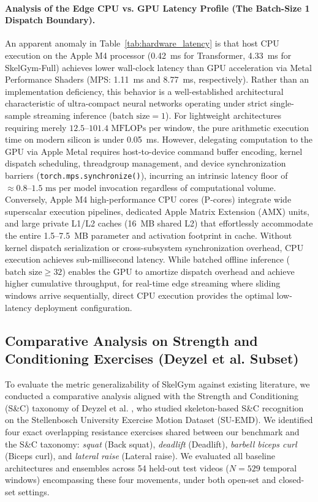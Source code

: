 \documentclass[runningheads]{llncs}
\begin{document}
\paragraph{Analysis of the Edge CPU vs. GPU Latency Profile (The Batch-Size 1 Dispatch Boundary).}
An apparent anomaly in Table~\ref{tab:hardware_latency} is that host CPU execution on the Apple M4 processor (0.42~ms for Transformer, 4.33~ms for SkelGym-Full) achieves lower wall-clock latency than GPU acceleration via Metal Performance Shaders (MPS: 1.11~ms and 8.77~ms, respectively). Rather than an implementation deficiency, this behavior is a well-established architectural characteristic of ultra-compact neural networks operating under strict single-sample streaming inference ($\text{batch size} = 1$). For lightweight architectures requiring merely $12.5\text{--}101.4\text{ MFLOPs}$ per window, the pure arithmetic execution time on modern silicon is under 0.05~ms. However, delegating computation to the GPU via Apple Metal requires host-to-device command buffer encoding, kernel dispatch scheduling, threadgroup management, and device synchronization barriers (\texttt{torch.mps.synchronize()}), incurring an intrinsic latency floor of $\approx 0.8\text{--}1.5\text{ ms}$ per model invocation regardless of computational volume. Conversely, Apple M4 high-performance CPU cores (P-cores) integrate wide superscalar execution pipelines, dedicated Apple Matrix Extension (AMX) units, and large private L1/L2 caches (16~MB shared L2) that effortlessly accommodate the entire 1.5--7.5~MB parameter and activation footprint in cache. Without kernel dispatch serialization or cross-subsystem synchronization overhead, CPU execution achieves sub-millisecond latency. While batched offline inference ($\text{batch size} \ge 32$) enables the GPU to amortize dispatch overhead and achieve higher cumulative throughput, for real-time edge streaming where sliding windows arrive sequentially, direct CPU execution provides the optimal low-latency deployment configuration.

\subsection{Comparative Analysis on Strength and Conditioning Exercises (Deyzel et al. Subset)}
\label{sec:external_benchmark}
To evaluate the metric generalizability of SkelGym against existing literature, we conducted a comparative analysis aligned with the Strength and Conditioning (S\&C) taxonomy of Deyzel et al. \cite{deyzel2023}, who studied skeleton-based S\&C recognition on the Stellenbosch University Exercise Motion Dataset (SU-EMD). We identified four exact overlapping resistance exercises shared between our benchmark and the S\&C taxonomy: \textit{squat} (Back squat), \textit{deadlift} (Deadlift), \textit{barbell biceps curl} (Biceps curl), and \textit{lateral raise} (Lateral raise). We evaluated all baseline architectures and ensembles across 54 held-out test videos ($N=529$ temporal windows) encompassing these four movements, under both open-set and closed-set settings.
\end{document}
